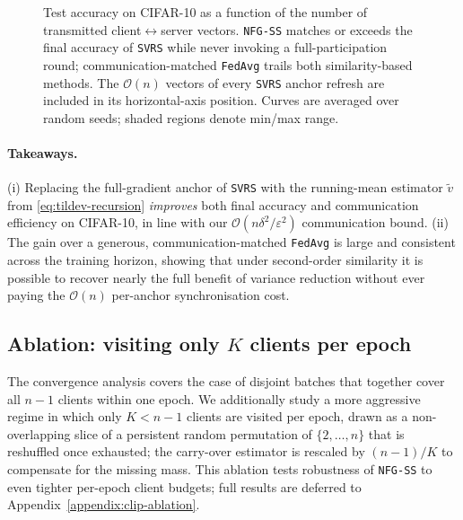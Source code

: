 \begin{figure}[t]
\centering
{}
\caption{Test accuracy on CIFAR-10 as a function of the number of
transmitted client$\leftrightarrow$server vectors. \texttt{NFG-SS}
matches or exceeds the final accuracy of \texttt{SVRS} while never
invoking a full-participation round; communication-matched
\texttt{FedAvg} trails both similarity-based methods. The
$\mathcal{O}(n)$ vectors of every \texttt{SVRS} anchor refresh are
included in its horizontal-axis position. Curves are averaged over
 random seeds; shaded regions denote min/max range.}
\label{fig:cifar10-curves}
\end{figure}

\paragraph{Takeaways.}
(i) Replacing the full-gradient anchor of \texttt{SVRS} with the
running-mean estimator $\tilde v$ from
\eqref{eq:tildev-recursion} \emph{improves} both final accuracy and
communication efficiency on CIFAR-10, in line with our
$\mathcal{O}(n\delta^2/\varepsilon^2)$ communication bound.
(ii) The gain over a generous, communication-matched \texttt{FedAvg}
is large and consistent across the training horizon, showing that
under second-order similarity it is possible to recover nearly the
full benefit of variance reduction without ever paying the
$\mathcal{O}(n)$ per-anchor synchronisation cost.

\subsection{Ablation: visiting only $K$ clients per epoch}
\label{sec:exp-ablation}

The convergence analysis covers the case of disjoint batches that
together cover all $n-1$ clients within one epoch. We additionally
study a more aggressive regime in which only $K<n-1$ clients are
visited per epoch, drawn as a non-overlapping slice of a persistent
random permutation of $\{2,\ldots,n\}$ that is reshuffled once
exhausted; the carry-over estimator is rescaled by $(n-1)/K$ to
compensate for the missing mass. This ablation tests robustness of
\texttt{NFG-SS} to even tighter per-epoch client budgets; full results
are deferred to Appendix~\ref{appendix:clip-ablation}.
